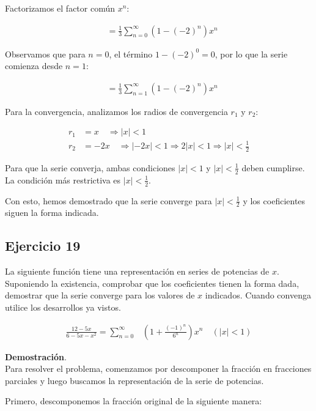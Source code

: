 \documentclass{article}
\begin{document}
    Factorizamos el factor común $x^n$:

    \begin{align*}
    &= \frac{1}{3} \sum_{n=0}^{\infty} \left(1 - (-2)^n \right) x^n
    \end{align*}

    Observamos que para $n = 0$, el término $1 - (-2)^0 = 0$, por lo que la serie comienza desde $n=1$:

    \begin{align*}
    &= \frac{1}{3} \sum_{n=1}^{\infty} \left(1 - (-2)^n\right) x^n
    \end{align*}

    Para la convergencia, analizamos los radios de convergencia $r_1$ y $r_2$:

    \begin{align*}
    r_1 &= x \quad \Rightarrow |x| < 1 \\
    r_2 &= -2x \quad \Rightarrow |-2x| < 1 \Rightarrow 2|x| < 1 \Rightarrow |x| < \frac{1}{2}
    \end{align*}

    Para que la serie converja, ambas condiciones $|x| < 1$ y $|x| < \frac{1}{2}$ deben cumplirse. La condición más restrictiva es $|x| < \frac{1}{2}$.

    Con esto, hemos demostrado que la serie converge para $|x| < \frac{1}{2}$ y los coeficientes siguen la forma indicada.

    \subsection*{Ejercicio 19}
    La siguiente función tiene una representación en series de potencias de $x$. Suponiendo la existencia, comprobar que los coeficientes tienen la forma dada, demostrar que la serie converge para los valores de $x$ indicados. Cuando convenga utilice los desarrollos ya vistos.

    $$
    \begin{aligned}
    \frac{12-5 x}{6-5 x-x^{2}}=\sum_{n=0}^{\infty} & \left(1+\frac{(-1)^{n}}{6^{n}}\right) x^{n} \quad(|x|<1)
    \end{aligned}
    $$

    \textbf{Demostración}.\\

    Para resolver el problema, comenzamos por descomponer la fracción en fracciones parciales y luego buscamos la representación de la serie de potencias.

    Primero, descomponemos la fracción original de la siguiente manera:
\end{document}
